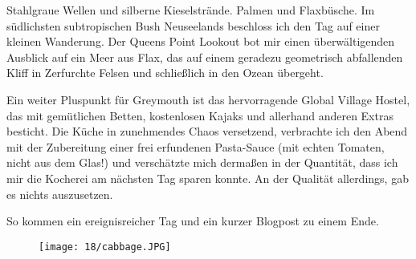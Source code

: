 Stahlgraue Wellen und silberne Kieselstrände. Palmen und
Flaxbüsche. Im südlichsten subtropischen Bush Neuseelands beschloss
ich den Tag auf einer kleinen Wanderung. Der Queens Point Lookout bot
mir einen überwältigenden Ausblick auf ein Meer aus Flax, das auf
einem geradezu geometrisch abfallenden Kliff in Zerfurchte Felsen und
schließlich in den Ozean übergeht.

Ein weiter Pluspunkt für Greymouth ist das hervorragende Global
Village Hostel, das mit gemütlichen Betten, kostenlosen Kajaks und
allerhand anderen Extras besticht. Die Küche in zunehmendes Chaos
versetzend, verbrachte ich den Abend mit der Zubereitung einer frei
erfundenen Pasta-Sauce (mit echten Tomaten, nicht aus dem Glas!) und
verschätzte mich dermaßen in der Quantität, dass ich mir die Kocherei
am nächsten Tag sparen konnte. An der Qualität allerdings, gab es
nichts auszusetzen.

So kommen ein ereignisreicher Tag und ein kurzer Blogpost zu einem
Ende.

\begin{figure}[h]
  \centering
  \texttt{[image: 18/cabbage.JPG]}
\end{figure}

